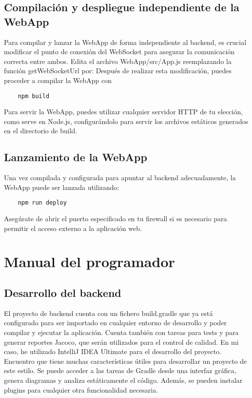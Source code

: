 \subsection{Compilación y despliegue independiente de la WebApp}
Para compilar y lanzar la WebApp de forma independiente al backend, es crucial modificar el punto de conexión del WebSocket para asegurar la comunicación correcta entre ambos. Edita el archivo WebApp/src/App.js reemplazando la función getWebSocketUrl por:
Después de realizar esta modificación, puedes proceder a compilar la WebApp con 
\begin{verbatim}
    npm build
\end{verbatim} 
Para servir la WebApp, puedes utilizar cualquier servidor HTTP de tu elección, como serve en Node.js, configurándolo para servir los archivos estáticos generados en el directorio de build.
\subsection{Lanzamiento de la WebApp}
Una vez compilada y configurada para apuntar al backend adecuadamente, la WebApp puede ser lanzada utilizando:
\begin{verbatim}
    npm run deploy
\end{verbatim}
Asegúrate de abrir el puerto especificado en tu firewall si es necesario para permitir el acceso externo a la aplicación web.
\section{Manual del programador}
\subsection{Desarrollo del backend}
El proyecto de backend cuenta con un fichero build.gradle que ya está configurado para ser importado en cualquier entorno de desarrollo y poder compilar y ejecutar la aplicación. Cuenta también con tareas para tests y para generar reportes Jacoco, que serán utilizados para el control de calidad. En mi caso, he utilizado IntelliJ IDEA Ultimate para el desarrollo del proyecto. Encuentro que tiene muchas características útiles para desarrollar un proyecto de este estilo. Se puede acceder a las tareas de Gradle desde una interfaz gráfica, genera diagramas y analiza estáticamente el código. Además, se pueden instalar plugins para cualquier otra funcionalidad necesaria. 

